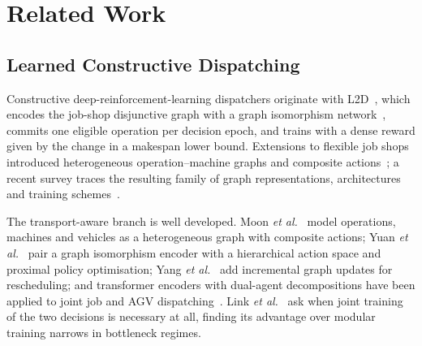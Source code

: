 %
%

\section{Related Work}
\label{sec:related}

\subsection{Learned Constructive Dispatching}

Constructive deep-reinforcement-learning dispatchers originate with
L2D~\cite{zhang2020l2d}, which encodes the job-shop disjunctive graph with a
graph isomorphism network~\cite{xu2019gin}, commits one eligible operation
per decision epoch, and trains with a dense reward given by the change in a
makespan lower bound. Extensions to flexible job shops introduced
heterogeneous operation--machine graphs and composite
actions~\cite{song2023fjsp}; a recent survey traces the resulting family of
graph representations, architectures and training schemes~\cite{smit2024gnnsurvey}.

The transport-aware branch is well developed. Moon \emph{et
al.}~\cite{moon2024hgs} model operations, machines and vehicles as a
heterogeneous graph with composite actions; Yuan \emph{et
al.}~\cite{yuan2026gin} pair a graph isomorphism encoder with a hierarchical
action space and proximal policy optimisation; Yang \emph{et
al.}~\cite{yang2026cosched} add incremental graph updates for rescheduling;
and transformer encoders with dual-agent decompositions have been applied to
joint job and AGV dispatching~\cite{matrans2026}. Link \emph{et
al.}~\cite{link2026coordination} ask when joint training of the two
decisions is necessary at all, finding its advantage over modular training
narrows in bottleneck regimes.

